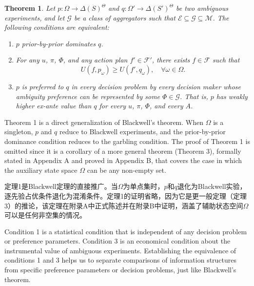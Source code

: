 \documentclass[12pt,a4paper]{article}
\newenvironment{original}
  {\par\vspace{4pt}\noindent\color{black}\ignorespaces}
  {\par\vspace{2pt}}
\newenvironment{translation}
  {\par\vspace{2pt}\noindent\color{myblue}\ignorespaces}
  {\par\vspace{6pt}}
\newtheorem{theorem}{Theorem}[section]
\newcommand{\Delt}{\Delta}
\newcommand{\calF}{\mathcal{F}}
\newcommand{\calM}{\mathcal{M}}
\newcommand{\calE}{\mathcal{E}}
\begin{document}
\begin{theorem}
Let $p:\Omega\to\Delt(S)^{\Theta}$ and $q:\Omega'\to\Delt(S')^{\Theta}$ be two ambiguous experiments, and let $\mathcal{G}$ be a class of aggregators such that $\calE\subseteq\mathcal{G}\subseteq\calM$. The following conditions are equivalent:
\begin{enumerate}
    \item $p$ prior-by-prior dominates $q$.
    \item For any $u$, $\pi$, $\Phi$, and any action plan $f'\in\calF'$, there exists $f\in\calF$ such that
    \begin{equation}
        U(f,p_{\omega})\geq U(f',q_{\omega}),\quad\forall\omega\in\Omega.
    \end{equation}
    \item $p$ is preferred to $q$ in every decision problem by every decision maker whose ambiguity preference can be represented by some $\Phi\in\mathcal{G}$. That is, $p$ has weakly higher ex-ante value than $q$ for every $u$, $\pi$, $\Phi$, and every $A$.
\end{enumerate}
\end{theorem}

\begin{original}
Theorem 1 is a direct generalization of Blackwell's theorem. When $\Omega$ is a singleton, $p$ and $q$ reduce to Blackwell experiments, and the prior-by-prior dominance condition reduces to the garbling condition. The proof of Theorem 1 is omitted since it is a corollary of a more general theorem (Theorem 3), formally stated in Appendix A and proved in Appendix B, that covers the case in which the auxiliary state space $\Omega$ can be any non-empty set.
\end{original}

\begin{translation}
定理1是Blackwell定理的直接推广。当$\Omega$为单点集时，$p$和$q$退化为Blackwell实验，逐先验占优条件退化为混淆条件。定理1的证明省略，因为它是更一般定理（定理3）的推论，该定理在附录A中正式陈述并在附录B中证明，涵盖了辅助状态空间$\Omega$可以是任何非空集的情况。
\end{translation}

\begin{original}
Condition 1 is a statistical condition that is independent of any decision problem or preference parameters. Condition 3 is an economical condition about the instrumental value of ambiguous experiments. Establishing the equivalence of conditions 1 and 3 helps us to separate comparisons of information structures from specific preference parameters or decision problems, just like Blackwell's theorem.
\end{original}
\end{document}
